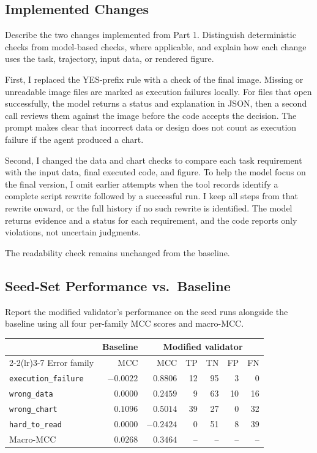 \documentclass[11pt]{article}
\begin{document}
\subsection{Implemented Changes}
Describe the two changes implemented from Part 1. Distinguish deterministic
checks from model-based checks, where applicable, and explain how each change
uses the task, trajectory, input data, or rendered figure.

\medskip
First, I replaced the YES-prefix rule with a check of the final image. Missing
or unreadable image files are marked as execution failures locally. For files
that open successfully, the model returns a status and explanation in JSON,
then a second call reviews them against the image before the code accepts the
decision. The prompt makes clear that incorrect data or design does not count
as execution failure if the agent produced a chart.

Second, I changed the data and chart checks to compare each task requirement
with the input data, final executed code, and figure. To help the model focus
on the final version, I omit earlier attempts when the tool records identify
a complete script rewrite followed by a successful run. I keep all steps from
that rewrite onward, or the full history if no such rewrite is identified.
The model returns evidence and a status for each requirement, and the code
reports only violations, not uncertain judgments.

The readability check remains unchanged from the baseline.

\subsection{Seed-Set Performance vs.\ Baseline}
Report the modified validator's performance on the seed runs alongside the
baseline using all four per-family MCC scores and macro-MCC.

\medskip
\begin{center}
\begin{tabular}{lrrrrrr}
\toprule
& Baseline & \multicolumn{5}{c}{Modified validator} \\
\cmidrule(lr){2-2}\cmidrule(lr){3-7}
Error family & MCC & MCC & TP & TN & FP & FN \\
\midrule
\texttt{execution\_failure} & $-0.0022$ & $0.8806$ & 12 & 95 & 3 & 0 \\
\texttt{wrong\_data} & $0.0000$ & $0.2459$ & 9 & 63 & 10 & 16 \\
\texttt{wrong\_chart} & $0.1096$ & $0.5014$ & 39 & 27 & 0 & 32 \\
\texttt{hard\_to\_read} & $0.0000$ & $-0.2424$ & 0 & 51 & 8 & 39 \\
\midrule
Macro-MCC & $0.0268$ & $0.3464$ & -- & -- & -- & -- \\
\bottomrule
\end{tabular}
\end{center}
\end{document}
